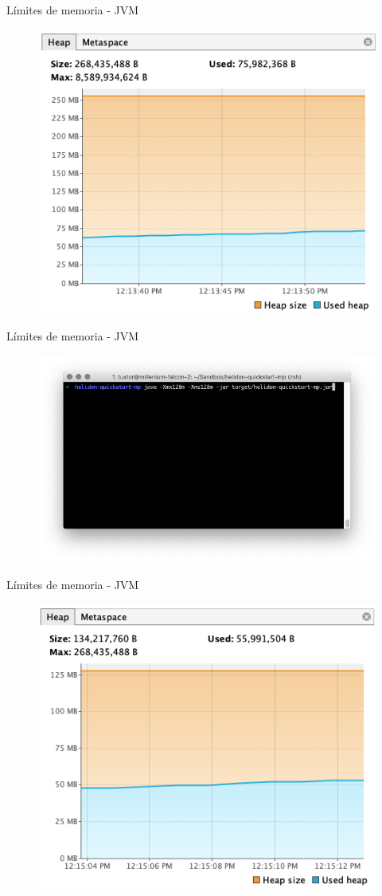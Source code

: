 \documentclass[aspectratio=169]{beamer}
\begin{document}
\begin{frame}{Límites de memoria - JVM}
    \begin{figure}
        \centering
        \includegraphics[width=0.6\linewidth]{Images/jvmnolimit.png}
        \label{fig:container}
    \end{figure}
\end{frame}

\begin{frame}{Límites de memoria - JVM}
    \begin{figure}
        \centering
        \includegraphics[width=0.9\linewidth]{Images/helidonmem.png}
        \label{fig:container}
    \end{figure}
\end{frame}

\begin{frame}{Límites de memoria - JVM}
    \begin{figure}
        \centering
        \includegraphics[width=0.6\linewidth]{Images/jvmlimit.png}
        \label{fig:container}
    \end{figure}
\end{frame}
\end{document}
